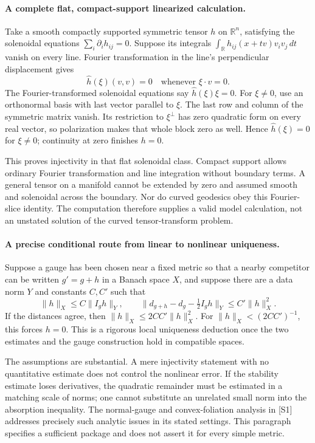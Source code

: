 \documentclass[11pt]{article}
\begin{document}
\paragraph{A complete flat, compact-support linearized calculation.}
Take a smooth compactly supported symmetric tensor $h$ on
$\mathbb R^n$, satisfying the solenoidal equations
$\sum_i\partial_i h_{ij}=0$. Suppose its integrals
$\int_{\mathbb R}h_{ij}(x+tv)v_iv_j\,dt$ vanish on every line.
Fourier transformation in the line's perpendicular displacement gives
\[
                    \widehat h(\xi)(v,v)=0
                    \quad\text{whenever }\xi\cdot v=0.
\]
The Fourier-transformed solenoidal equations say
$\widehat h(\xi)\xi=0$. For $\xi\ne0$, use an orthonormal basis
with last vector parallel to $\xi$. The last row and column of the
symmetric matrix vanish. Its restriction to $\xi^\perp$ has zero
quadratic form on every real vector, so polarization makes that whole
block zero as well. Hence $\widehat h(\xi)=0$ for $\xi\ne0$;
continuity at zero finishes $h=0$.

This proves injectivity in that flat solenoidal class. Compact support
allows ordinary Fourier transformation and line integration without
boundary terms. A general tensor on a manifold cannot be extended by
zero and assumed smooth and solenoidal across the boundary. Nor do
curved geodesics obey this Fourier-slice identity. The computation
therefore supplies a valid model calculation, not an unstated solution
of the curved tensor-transform problem.

\paragraph{A precise conditional route from linear to nonlinear uniqueness.}
Suppose a gauge has been chosen near a fixed metric so that a nearby
competitor can be written $g'=g+h$ in a Banach space $X$, and suppose
there are a data norm $Y$ and constants $C,C'$ such that
\[
 \|h\|_X\le C\|I_gh\|_Y,
 \qquad
 \|d_{g+h}-d_g-\tfrac12 I_gh\|_Y\le C'\|h\|_X^2.
\]
If the distances agree, then
$\|h\|_X\le2CC'\|h\|_X^2$. For
$\|h\|_X<(2CC')^{-1}$, this forces $h=0$. This is a rigorous
local uniqueness deduction once the two estimates and the gauge
construction hold in compatible spaces.

The assumptions are substantial. A mere injectivity statement with
no quantitative estimate does not control the nonlinear error.
If the stability estimate loses derivatives, the quadratic remainder
must be estimated in a matching scale of norms; one cannot substitute
an unrelated small norm into the absorption inequality. The normal-gauge
and convex-foliation analysis in [S1] addresses precisely such analytic
issues in its stated settings. This paragraph specifies a sufficient
package and does not assert it for every simple metric.
\end{document}
